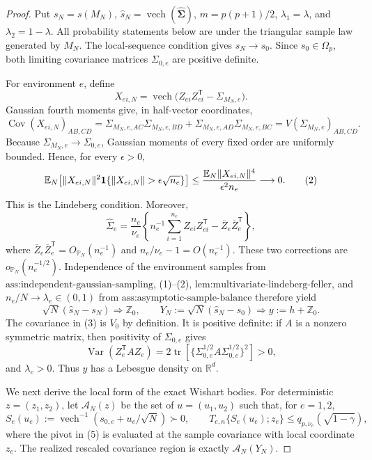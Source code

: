 \documentclass{article}
\begin{document}
\begin{proof}
Put \(s_N=s(M_N)\), \(\widehat s_N=\operatorname{vech}(\widehat{\boldsymbol\Sigma})\), \(m=p(p+1)/2\), \(\lambda_1=\lambda\), and \(\lambda_2=1-\lambda\). All probability statements below are under the triangular sample law generated by \(M_N\). The local-sequence condition gives \(s_N\to s_0\). Since \(s_0\in\Omega_p\), both limiting covariance matrices \(\Sigma_{0,e}\) are positive definite.

For environment \(e\), define
\[
 X_{ei,N}=\operatorname{vech}
 \bigl(Z_{ei}Z_{ei}^{\mathsf T}-\Sigma_{M_N,e}\bigr).
\]
Gaussian fourth moments give, in half-vector coordinates,
\[
 \operatorname{Cov}(X_{ei,N})_{AB,CD}
 =\Sigma_{M_N,e,AC}\Sigma_{M_N,e,BD}
  +\Sigma_{M_N,e,AD}\Sigma_{M_N,e,BC}
 =V(\Sigma_{M_N,e})_{AB,CD}.
 \tag{1}
\]
Because \(\Sigma_{M_N,e}\to\Sigma_{0,e}\), Gaussian moments of every fixed order are uniformly bounded. Hence, for every \(\epsilon>0\),
\[
 \mathbb E_N\!\left[
 \|X_{ei,N}\|^2
 {\bf1}\{\|X_{ei,N}\|>\epsilon\sqrt{n_e}\}
 \right]
 \le
 \frac{\mathbb E_N\|X_{ei,N}\|^4}{\epsilon^2n_e}
 \longrightarrow0.
 \tag{2}
\]
This is the Lindeberg condition. Moreover,
\[
 \widehat\Sigma_e
 =\frac{n_e}{\nu_e}
 \left\{n_e^{-1}\sum_{i=1}^{n_e}Z_{ei}Z_{ei}^{\mathsf T}
       -\overline Z_e\overline Z_e^{\mathsf T}\right\},
\]
where \(\overline Z_e\overline Z_e^{\mathsf T}=O_{\mathbb P_N}(n_e^{-1})\) and \(n_e/\nu_e-1=O(n_e^{-1})\). These two corrections are \(o_{\mathbb P_N}(n_e^{-1/2})\). Independence of the environment samples from \(\text{ass:independent-gaussian-sampling}\), (1)--(2), \(\text{lem:multivariate-lindeberg-feller}\), and \(n_e/N\to\lambda_e\in(0,1)\) from \(\text{ass:asymptotic-sample-balance}\) therefore yield
\[
 \sqrt N(\widehat s_N-s_N)\Rightarrow\mathbb Z_0,
 \qquad
 Y_N:=\sqrt N(\widehat s_N-s_0)
 \Rightarrow y:=h+\mathbb Z_0.
 \tag{3}
\]
The covariance in (3) is \(V_0\) by definition. It is positive definite: if \(A\) is a nonzero symmetric matrix, then positivity of \(\Sigma_{0,e}\) gives
\[
 \operatorname{Var}(Z_e^{\mathsf T}AZ_e)
 =2\operatorname{tr}\!\left[
   \{\Sigma_{0,e}^{1/2}A\Sigma_{0,e}^{1/2}\}^2
 \right]>0,
 \tag{4}
\]
and \(\lambda_e>0\). Thus \(y\) has a Lebesgue density on \(\mathbb R^d\).

We next derive the local form of the exact Wishart bodies. For deterministic \(z=(z_1,z_2)\), let \(\mathcal A_N(z)\) be the set of \(u=(u_1,u_2)\) such that, for \(e=1,2\),
\[
 S_e(u_e):=\operatorname{vech}^{-1}(s_{0,e}+u_e/\sqrt N)\succ0,
 \qquad
 T_{e,n}\{S_e(u_e);z_e\}
 \le q_{p,\nu_e}(\sqrt{1-\gamma}),
 \tag{5}
\]
where the pivot in (5) is evaluated at the sample covariance with local coordinate \(z_e\). The realized rescaled covariance region is exactly \(\mathcal A_N(Y_N)\).


\end{proof}
\end{document}
